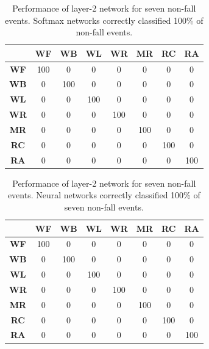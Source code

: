 \documentclass[]{IEEEtran}
\begin{document}
\begin{table}[htb]
\caption{Performance of layer-2 network for  seven non-fall events. Softmax
networks correctly classified 100\% of non-fall events.}
\label{Layer2NonFallEventsSoftmax}
\centering
{
\begin{tabular}{|c|c|c|c|c|c|c|c|}
\hline 
 & \textbf{WF} & \textbf{WB} & \textbf{WL} & \textbf{WR} & \textbf{MR} & 
\textbf{RC} & \textbf{RA} \\ \hline    
\textbf{WF} & 100 &  0 &  0 &  0 &  0 &  0 &  0 \\ \hline
\textbf{WB} & 0 &  100 &  0 &  0 &  0 &  0 &  0 \\ \hline
\textbf{WL} & 0 &  0 &  100 &  0 &  0 &  0 &  0 \\ \hline
\textbf{WR} & 0 &  0 &  0 &  100 &  0 &  0 &  0 \\ \hline
\textbf{MR} & 0 &  0 &  0 &  0 &  100 &  0 &  0 \\ \hline
\textbf{RC} & 0 &  0 &  0 &  0 &  0 &  100 &  0 \\ \hline
\textbf{RA} & 0 &  0 &  0 &  0 &  0 &  0 &  100 \\ \hline
\end{tabular}
}
\end{table}



\begin{table}[htb]
\caption{Performance of layer-2 network for  seven non-fall events. Neural
networks correctly classified 100\% of  seven non-fall events.}
\label{Layer2NonFallEventsNeuralNets}
\centering
{
\begin{tabular}{|c|c|c|c|c|c|c|c|}
\hline 
 & \textbf{WF} & \textbf{WB} & \textbf{WL} & \textbf{WR} & \textbf{MR} & 
\textbf{RC} & \textbf{RA} \\ \hline 
\textbf{WF} & 100 &  0 &  0 &  0 &  0 &  0 &  0 \\ \hline
\textbf{WB} & 0 &  100 &  0 &  0 &  0 &  0 &  0 \\ \hline
\textbf{WL} & 0 &  0 &  100 &  0 &  0 &  0 &  0 \\ \hline
\textbf{WR} & 0 &  0 &  0 &  100 &  0 &  0 &  0 \\ \hline
\textbf{MR} & 0 &  0 &  0 &  0 &  100 &  0 &  0 \\ \hline
\textbf{RC} & 0 &  0 &  0 &  0 &  0 &  100 &  0 \\ \hline
\textbf{RA} & 0 &  0 &  0 &  0 &  0 &  0 &  100 \\ \hline
\end{tabular}
}
\end{table}
\end{document}
